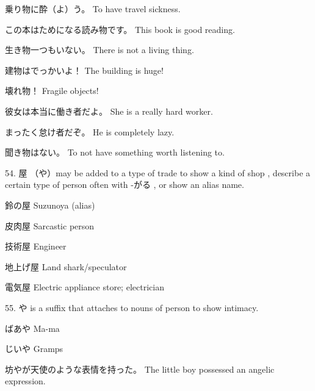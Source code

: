 \par{乗り物に酔（よ）う。 \hfill\break
To have travel sickness. }

\par{この本はためになる読み物です。 \hfill\break
This book is good reading. }

\par{生き物一つもいない。 \hfill\break
There is not a living thing. }

\par{建物はでっかいよ！ \hfill\break
The building is huge! }

\par{壊れ物！ \hfill\break
Fragile objects! }

\par{彼女は本当に働き者だよ。 \hfill\break
She is a really hard worker. }

\par{まったく怠け者だぞ。 \hfill\break
He is completely lazy. }

\par{聞き物はない。 \hfill\break
To not have something worth listening to. }

\par{54. 屋 （や）may be added to a type of trade to show a kind of shop , describe a certain type of person often with -がる , or show an alias name. }

\par{鈴の屋 \hfill\break
Suzunoya (alias) }

\par{皮肉屋 \hfill\break
Sarcastic person }

\par{技術屋 \hfill\break
Engineer }

\par{地上げ屋 \hfill\break
Land shark\slash speculator }

\par{電気屋 \hfill\break
Electric appliance store; electrician }

\par{55. や is a suffix that attaches to nouns of person to show intimacy. }

\par{ばあや \hfill\break
Ma-ma }

\par{じいや \hfill\break
Gramps }

\par{坊やが天使のような表情を持った。 \hfill\break
The little boy possessed an angelic expression. }

